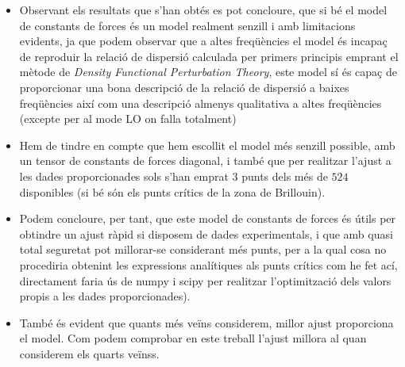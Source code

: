\documentclass[12pt]{article} %
\begin{document}
\begin{itemize}

\item Observant els resultats que s'han obtés es pot concloure, que si bé el model de constants de forces és un model realment senzill i amb limitacions evidents, ja que podem observar que a altes freqüències el model és incapaç de reproduir la relació de dispersió calculada per primers principis emprant el mètode de \emph {Density Functional Perturbation Theory}, este model sí és capaç de proporcionar una bona descripció de la relació de dispersió a baixes freqüències així com una descripció almenys qualitativa a altes freqüències (excepte per al mode LO on falla totalment) 



\item Hem de tindre en compte que hem escollit el model més senzill possible, amb un tensor de constants de forces diagonal, i també que per realitzar l'ajust a les dades proporcionades sols s'han emprat $3$ punts dels més de $524$ disponibles (si bé són els punts crítics de la zona de Brillouin).
\item Podem concloure, per tant, que este model de constants de forces és útils per obtindre un ajust ràpid si disposem de dades experimentals, i que amb quasi total seguretat pot millorar-se considerant més punts, per a la qual cosa no procediria obtenint les expressions analítiques als punts crítics com he fet ací, directament faria ús de numpy i scipy per realitzar l'optimització dels valors propis a les dades proporcionades).
\item També és evident que quants més veïns considerem, millor ajust proporciona el model. Com podem comprobar en este treball l'ajust millora al quan considerem els quarts veïnss.
\end{itemize}

\vspace{\baselineskip}
\end{document}
